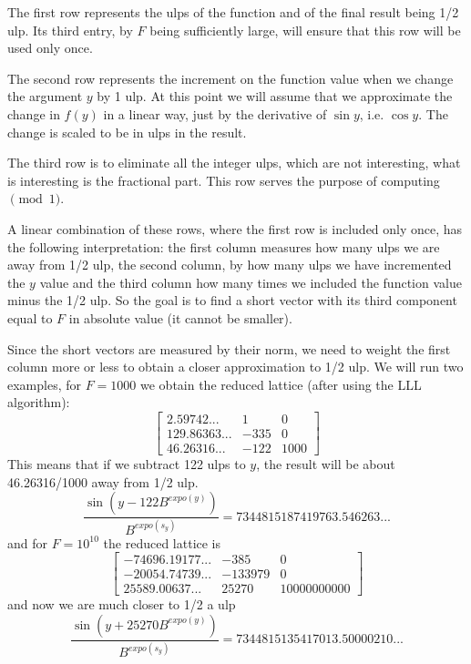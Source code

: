 \documentclass{article}
\begin{document}
The first row represents the ulps of the function and of the final
result being 1/2 ulp.  Its third entry, by $F$ being sufficiently
large, will ensure that this row will be used only once.

The second row represents the increment on the function value when
we change the argument $y$ by 1 ulp.  At this point we will assume
that we approximate the change in $f(y)$ in a linear way, just by
the derivative of $\sin y$, i.e. $\cos y$.  The change is scaled
to be in ulps in the result.

The third row is to eliminate all the integer ulps, which are not
interesting, what is interesting is the fractional part.  This row
serves the purpose of computing $\pmod 1$.

A linear combination of these rows, where the first row is included
only once, has the following interpretation:
the first column measures how many ulps we are away from 1/2 ulp,
the second column, by how many ulps we have incremented the $y$ value
and the third column how many times we included the function value
minus the 1/2 ulp.
So the goal is to find a short vector with its third component
equal to $F$ in absolute value (it cannot be smaller).

Since the short vectors are measured by their norm, we need to
weight the first column more or less to obtain a closer approximation
to 1/2 ulp.
We will run two examples, for $F=1000$ we obtain the reduced lattice
(after using the LLL algorithm):
\[ \left [ \begin{array}{ccc}
  2.59742... & 1 & 0 \\
129.86363... & -335 & 0 \\
 46.26316... & -122 & 1000
\end{array} \right ] \]
This means that if we subtract 122 ulps to $y$, the result will be about
46.26316/1000 away from 1/2 ulp.
\[ \frac{ \sin ( y - 122B^{expo(y)} )} {B^{expo(s_y)}} =
 7344815187419763.546263... \]
and for $F=10^{10}$ the reduced lattice is
\[ \left [ \begin{array}{ccc}
-74696.19177... & -385 & 0 \\
-20054.74739... & -133979 & 0 \\
 25589.00637... & 25270 & 10000000000 
\end{array} \right ] \]
and now we are much closer to 1/2 a ulp
\[ \frac{ \sin ( y + 25270B^{expo(y)} )} {B^{expo(s_y)}} =
 7344815135417013.50000210... \]
\end{document}
